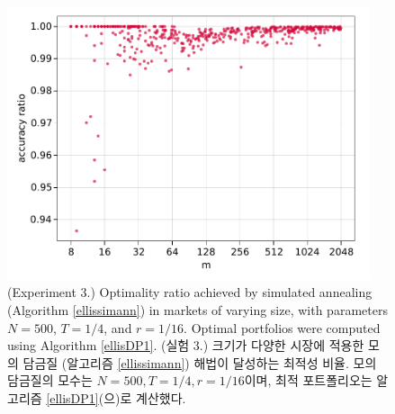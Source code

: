\documentclass[11pt]{article} %
\theoremstyle{definition}
\theoremstyle{definition}
\begin{document}
\begin{figure}[h!] 
\centering
\includegraphics[width=0.95\textwidth]{./plots/accuracy_simulatedannealing.pdf}
  \caption{\label{experiment3results}
 \ifen (Experiment 3.) Optimality ratio achieved by simulated annealing (Algorithm \ref{ellissimann}) in markets of varying size, with parameters $N = 500$, $T = 1/4$, and $r = 1/16$. Optimal portfolios were computed using Algorithm \ref{ellisDP1}. 
 \else  (실험 3.) 크기가 다양한 시장에 적용한 모의 담금질 (알고리즘 \ref{ellissimann}) 해법이 달성하는 최적성 비율. 모의 담금질의 모수는 $N = 500, T = 1/4, r = 1/16$이며, 최적 포트폴리오는 알고리즘 \ref{ellisDP1}(으)로 계산했다. \fi}
\end{figure}
\end{document}
